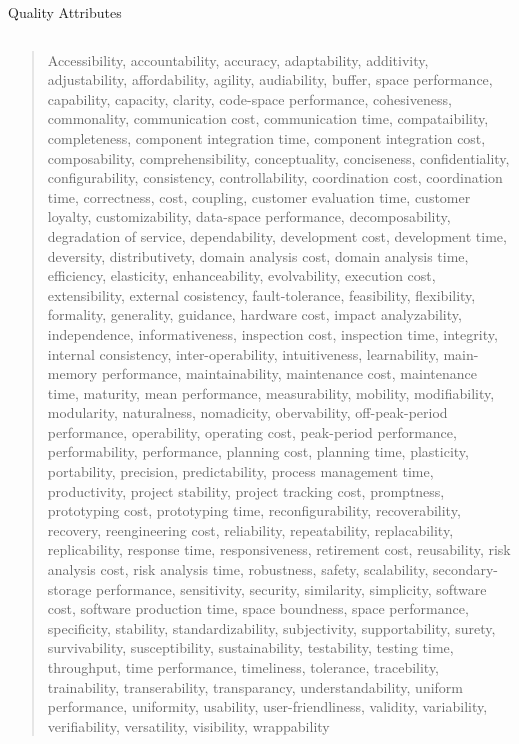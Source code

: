 \documentclass[10pt,t,a4paper]{beamer}
\begin{document}
\begin{frame}[shrink=35,label=sec-1-8]{Quality Attributes}
\begin{columns}
\begin{column}{0.7\textwidth}
\begin{verse}
Accessibility, accountability, accuracy, adaptability, additivity, adjustability, affordability, agility, audiability, buffer, space performance, capability, capacity, clarity, code-space performance, cohesiveness, commonality, communication cost, communication time, compataibility, completeness, component integration time, component integration cost, composability, comprehensibility, conceptuality, conciseness, confidentiality, configurability, consistency, controllability, coordination cost, coordination time, correctness, cost, coupling, customer evaluation time, customer loyalty, customizability, data-space performance, decomposability, degradation of service, dependability, development cost, development time, deversity, distributivety, domain analysis cost, domain analysis time, efficiency, elasticity, enhanceability, evolvability, execution cost, extensibility, external cosistency, fault-tolerance, feasibility, flexibility, formality, generality, guidance, hardware cost, impact analyzability, independence, informativeness, inspection cost, inspection time, integrity, internal consistency, inter-operability, intuitiveness, learnability, main-memory performance, maintainability, maintenance cost, maintenance time, maturity, mean performance, measurability, mobility, modifiability, modularity, naturalness, nomadicity, obervability, off-peak-period performance, operability, operating cost, peak-period performance, performability, performance, planning cost, planning time, plasticity, portability, precision, predictability, process management time, productivity, project stability, project tracking cost, promptness, prototyping cost, prototyping time, reconfigurability, recoverability, recovery, reengineering cost, reliability, repeatability, replacability, replicability, response time, responsiveness, retirement cost, reusability, risk analysis cost, risk analysis time, robustness, safety, scalability, secondary-storage performance, sensitivity, security, similarity, simplicity, software cost, software production time, space boundness, space  performance, specificity, stability, standardizability, subjectivity, supportability, surety, survivability, susceptibility, sustainability, testability, testing time, throughput, time performance, timeliness, tolerance, tracebility, trainability, transerability, transparancy, understandability, uniform performance, uniformity, usability, user-friendliness, validity, variability, verifiability, versatility, visibility, wrappability \\

\end{verse}
\end{column}
\end{columns}
\end{frame}
\end{document}
